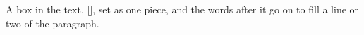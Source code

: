 A box in the text, \hbox{[]}, set as one piece, and
the words after it go on to fill a line or two of the paragraph.
